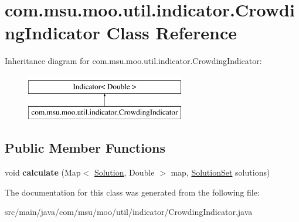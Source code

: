 \hypertarget{classcom_1_1msu_1_1moo_1_1util_1_1indicator_1_1CrowdingIndicator}{\section{com.\-msu.\-moo.\-util.\-indicator.\-Crowding\-Indicator Class Reference}
\label{classcom_1_1msu_1_1moo_1_1util_1_1indicator_1_1CrowdingIndicator}
}
Inheritance diagram for com.\-msu.\-moo.\-util.\-indicator.\-Crowding\-Indicator\-:\begin{figure}[H]
\begin{center}
\leavevmode
\includegraphics[height=2.000000cm]{classcom_1_1msu_1_1moo_1_1util_1_1indicator_1_1CrowdingIndicator}
\end{center}
\end{figure}
\subsection*{Public Member Functions}
\begin{DoxyCompactItemize}
\item 
\hypertarget{classcom_1_1msu_1_1moo_1_1util_1_1indicator_1_1CrowdingIndicator_a2a08f9285b560a4fd2213022672d100a}{void {\bfseries calculate} (Map$<$ \hyperlink{classcom_1_1msu_1_1moo_1_1model_1_1solution_1_1Solution}{Solution}, Double $>$ map, \hyperlink{classcom_1_1msu_1_1moo_1_1model_1_1solution_1_1SolutionSet}{Solution\-Set} solutions)}\label{classcom_1_1msu_1_1moo_1_1util_1_1indicator_1_1CrowdingIndicator_a2a08f9285b560a4fd2213022672d100a}

\end{DoxyCompactItemize}


The documentation for this class was generated from the following file\-:\begin{DoxyCompactItemize}
\item 
src/main/java/com/msu/moo/util/indicator/Crowding\-Indicator.\-java\end{DoxyCompactItemize}
